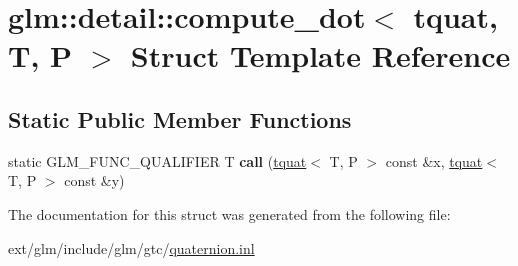 \hypertarget{structglm_1_1detail_1_1compute__dot_3_01tquat_00_01_t_00_01_p_01_4}{\section{glm\-:\-:detail\-:\-:compute\-\_\-dot$<$ tquat, T, P $>$ Struct Template Reference}
\label{structglm_1_1detail_1_1compute__dot_3_01tquat_00_01_t_00_01_p_01_4}
}
\subsection*{Static Public Member Functions}
\begin{DoxyCompactItemize}
\item 
\hypertarget{structglm_1_1detail_1_1compute__dot_3_01tquat_00_01_t_00_01_p_01_4_a4f27c293f2e5e43f23e019303336601e}{static G\-L\-M\-\_\-\-F\-U\-N\-C\-\_\-\-Q\-U\-A\-L\-I\-F\-I\-E\-R T {\bfseries call} (\hyperlink{structglm_1_1tquat}{tquat}$<$ T, P $>$ const \&x, \hyperlink{structglm_1_1tquat}{tquat}$<$ T, P $>$ const \&y)}\label{structglm_1_1detail_1_1compute__dot_3_01tquat_00_01_t_00_01_p_01_4_a4f27c293f2e5e43f23e019303336601e}

\end{DoxyCompactItemize}


The documentation for this struct was generated from the following file\-:\begin{DoxyCompactItemize}
\item 
ext/glm/include/glm/gtc/\hyperlink{glm_2include_2glm_2gtc_2quaternion_8inl}{quaternion.\-inl}\end{DoxyCompactItemize}
